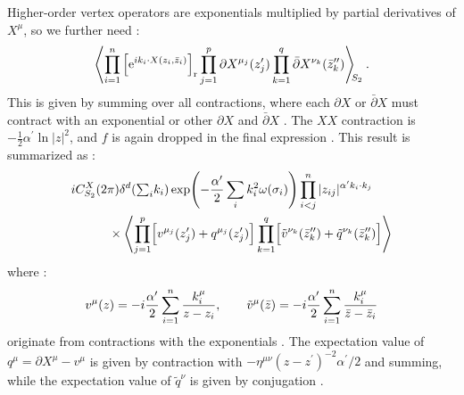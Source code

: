 Higher-order vertex operators are exponentials multiplied by partial derivatives of $X^{\mu}$, so we further need :
\begin{equation}
	\Biggl\langle\prod_{i=1}^{n}\left[\mathrm{e}^{i k_{i} \cdot X(z_{i}, \bar{z}_{i})}\right]_{\mathrm{r}} 
	\prod_{j=1}^{p} \partial X^{\mu_{j}}(z_{j}^{\prime}) \prod_{k=1}^{q} \bar{\partial} X^{\nu_{k}}(\bar{z}_{k}^{\prime \prime})\Biggr\rangle \biggr._{\!\!S_{2}} \:. \label{6.2.18}
\end{equation}
This is given by summing over all contractions, where each $\partial X$ or $\bar{\partial} X$ must contract with an exponential or other $\partial X$ and $\bar{\partial} X$ . The $XX$ contraction is $-\frac{1}{2} \alpha^{\prime} \ln |z|^{2}$, and $f$ is again dropped in the final expression . This result is summarized as :
\begin{align}
	&i C_{S_{2}}^{X}(2 \pi)  \delta^{d}({\textstyle\sum_{i} }k_{i}) 
	\exp\Biggl(-\frac{\alpha'}{2}\sum_{i}k_{i}^{2}\omega(\sigma_{i})\Biggr)
	\prod_{i<j}^{n}|z_{i j}|^{\alpha^{\prime} k_{i} \cdot k_{j}}  \nonumber \\
	& \qquad \quad \times\Biggl\langle 
	\prod_{j=1}^{p}\Bigl[v^{\mu_{j}}(z_{j}^{\prime})+q^{\mu_{j}}(z_{j}^{\prime})\Bigr] 
	\prod_{k=1}^{q}\Bigl[\tilde{v}^{\nu_{k}}(\bar{z}_{k}^{\prime \prime})+\tilde{q}^{\nu_{k}}(\bar{z}_{k}^{\prime \prime})\Bigr]\Biggr\rangle  \label{6.2.19}
\end{align}
where :
\begin{equation}
	v^{\mu}(z)=- i \frac{\alpha^{\prime}}{2} \sum_{i=1}^{n} \frac{k_{i}^{\mu}}{z-z_{i}}, \qquad 
	\tilde{v}^{\mu}(\bar{z})=-i \frac{\alpha^{\prime}}{2} \sum_{i=1}^{n} \frac{k_{i}^{\mu}}{\bar{z}-\bar{z}_{i}} \label{6.2.20}
\end{equation}
originate from contractions with the exponentials . The expectation value of $q^{\mu}=\partial X^{\mu}-v^{\mu}$ is given by contraction with $-\eta^{\mu \nu}(z-z^{\prime})^{-2} \alpha^{\prime} / 2$ and summing, while the expectation value of $\tilde{q}^{\nu}$ is given by conjugation .
